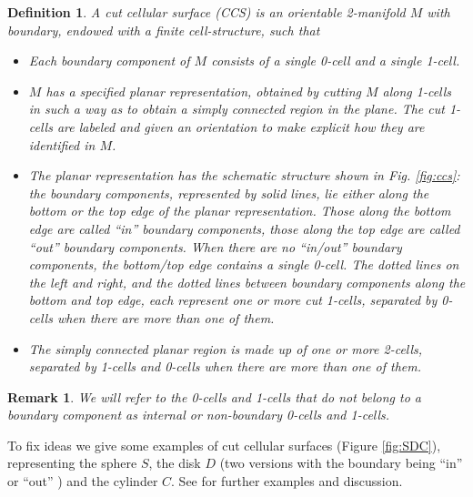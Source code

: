 \documentclass[a4paper,11pt]{article}
\newtheorem{Definition}[Theorem]{Definition}
\newtheorem{Remark}[Theorem]{Remark}
\begin{document}
\begin{Definition}

A cut cellular surface (CCS) is an orientable 2-manifold $M$ with boundary, endowed with a finite cell-structure, such that

\begin{itemize}

\item[a)] Each boundary component of $M$ consists of a single 0-cell and a single 1-cell.

\item[b)] $M$ has a specified planar representation, obtained by cutting $M$ along 1-cells in such a way as to obtain a simply connected region in the plane. The cut 1-cells are labeled and given an orientation to make explicit how they are identified in $M$.

\item[c)] The planar representation has the schematic structure shown in Fig. \ref{fig:ccs}: the boundary components, represented by solid lines, lie either along the bottom or the top edge of the planar representation. Those along the bottom edge are called ``in'' boundary components, those along the top edge are called ``out'' boundary components. When there are no ``in/out'' boundary components, the bottom/top edge contains a single 0-cell. The dotted lines on the left and right, and the dotted lines between boundary components along the bottom and top edge, each represent one or more cut 1-cells, separated by 0-cells when there are more than one of them.

\item[d)] The simply connected planar region is made up of one or more 2-cells, separated by 1-cells and 0-cells when there are more than one of them.



\end{itemize}

\label{def:ccs}

\end{Definition}

\begin{Remark}
We will refer to the 0-cells and 1-cells that do not belong to a boundary component as internal or non-boundary 0-cells and 1-cells.
\end{Remark}

To fix ideas we give some examples of cut cellular surfaces (Figure \ref{fig:SDC}), representing the sphere $S$, the disk $D$ (two versions with the boundary being ``in'' or ``out'' ) and the cylinder $C$. See \cite{bp1} for further examples and discussion. 
\end{document}
